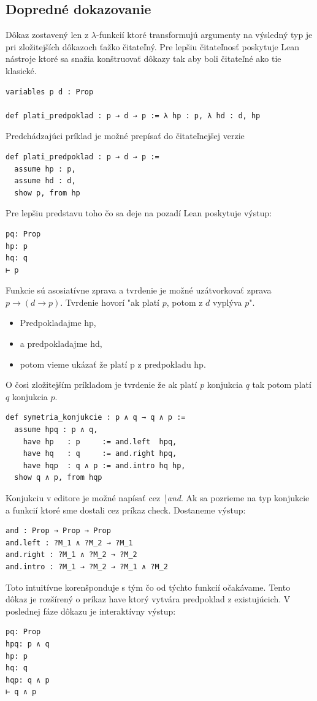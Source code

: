 \documentclass[a4paper,10pt,oneside]{report}%
\begin{document}
\subsection{Dopredné dokazovanie}
    Dôkaz zostavený len z $\lambda$-funkcií ktoré transformujú argumenty
na výsledný typ je pri zložitejších dôkazoch ťažko čitateľný.
    Pre lepšiu čitateľnosť poskytuje Lean nástroje ktoré sa snažia konštruovať dôkazy tak
aby boli čitateľné ako tie klasické.
\begin{lstlisting}
variables p d : Prop

def plati_predpoklad : p → d → p := λ hp : p, λ hd : d, hp
\end{lstlisting}
    Predchádzajúci príklad je možné prepísať do čitateľnejšej verzie
\begin{lstlisting}
def plati_predpoklad : p → d → p :=
  assume hp : p,
  assume hd : d,
  show p, from hp
\end{lstlisting}
Pre lepšiu predstavu toho čo sa deje na pozadí Lean poskytuje výstup:
\begin{lstlisting}
pq: Prop
hp: p
hq: q
⊢ p
\end{lstlisting}
    Funkcie sú asosiatívne zprava a tvrdenie je možné uzátvorkovať zprava
$p \to ( d \to p )$. Tvrdenie hovorí "ak platí $p$, potom z $d$ vyplýva $p$".
\begin{itemize}
    \item Predpokladajme hp,
    \item a predpokladajme hd,
    \item potom vieme ukázať že platí p z predpokladu hp.
\end{itemize}
    O čosi zložitejším príkladom je tvrdenie že ak platí $p$ konjukcia $q$ tak potom
platí $q$ konjukcia $p$.
\begin{lstlisting}
def symetria_konjukcie : p ∧ q → q ∧ p :=
  assume hpq : p ∧ q,
    have hp   : p     := and.left  hpq,
    have hq   : q     := and.right hpq,
    have hqp  : q ∧ p := and.intro hq hp,
  show q ∧ p, from hqp
\end{lstlisting}
    Konjukciu v editore je možné napísať cez \emph{\textbackslash and}.
    Ak sa pozrieme na typ konjukcie a funkcií ktoré sme dostali cez príkaz check.
    Dostaneme výstup:
\begin{lstlisting}
and : Prop → Prop → Prop
and.left : ?M_1 ∧ ?M_2 → ?M_1
and.right : ?M_1 ∧ ?M_2 → ?M_2
and.intro : ?M_1 → ?M_2 → ?M_1 ∧ ?M_2
\end{lstlisting}
    Toto intuitívne korenšponduje s tým čo od týchto funkcií očakávame.
    Tento dôkaz je rozšírený o príkaz have ktorý vytvára predpoklad z existujúcich.
    V poslednej fáze dôkazu je interaktívny výstup:
\begin{lstlisting}
pq: Prop
hpq: p ∧ q
hp: p
hq: q
hqp: q ∧ p
⊢ q ∧ p
\end{lstlisting}
\end{document}
